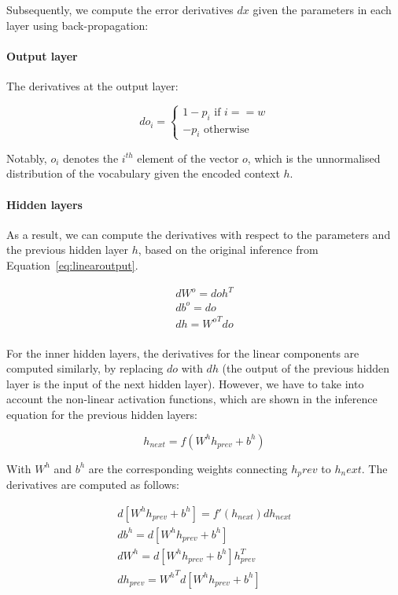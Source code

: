 Subsequently, we compute the error derivatives $dx$ given the parameters in each layer using back-propagation:

\paragraph{Output layer}

The derivatives at the output layer:

\begin{equation}
do_i = 
\begin{cases}
1 - p_i \text{ if } i == w \\
-p_i \text{     otherwise}
\end{cases}
\end{equation}

Notably, $o_i$ denotes the $i^{th}$ element of the vector $o$, which is the unnormalised distribution of the vocabulary given the encoded context $h$. 

\paragraph{Hidden layers}
As a result, we can compute the derivatives with respect to the parameters and the previous hidden layer $h$, based on the original inference from Equation~\ref{eq:linearoutput}. 

\begin{equation}
\begin{aligned}
dW^o = doh^T \\
db^o = do \\ 
dh = {W^o}^Tdo \\
\end{aligned}
\end{equation}


For the inner hidden layers, the  derivatives for the linear components are computed similarly, by replacing $do$ with $dh$ (the output of the previous hidden layer is the input of the next hidden layer). However, we have to take into account the non-linear activation functions, which are shown in the inference equation for the previous hidden layers:

\begin{equation}
h_{next} = f(W^h h_{prev} + b^h)
\end{equation}

With $W^h$ and $b^h$ are the corresponding weights connecting $h_prev$ to $h_next$. The derivatives are computed as follows:

\begin{equation}
\begin{aligned}
d[W^h h_{prev} + b^h] = f'(h_{next}) dh_{next} \\
db^h = d[W^h h_{prev} + b^h] \\
dW^h = d[W^h h_{prev} + b^h]h_{prev}^T \\
dh_{prev} = {W^h}^T d[W^h h_{prev} + b^h]
\label{eq:dhidden}
\end{aligned} 
\end{equation}


